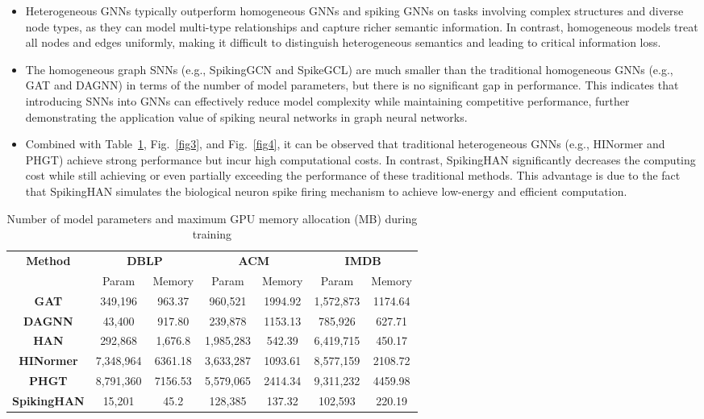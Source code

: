 \documentclass[letterpaper]{article} %
\begin{document}
\begin{itemize}
    \item Heterogeneous GNNs typically outperform homogeneous GNNs and spiking GNNs on tasks involving complex structures and diverse node types, as they can model multi-type relationships and capture richer semantic information. In contrast, homogeneous models treat all nodes and edges uniformly, making it difficult to distinguish heterogeneous semantics and leading to critical information loss.
    \item The homogeneous graph SNNs (e.g., SpikingGCN and SpikeGCL) are much smaller than the traditional homogeneous GNNs (e.g., GAT and DAGNN) in terms of the number of model parameters, but there is no significant gap in performance. This indicates that introducing SNNs into GNNs can effectively reduce model complexity while maintaining competitive performance, further demonstrating the application value of spiking neural networks in graph neural networks.
    \item Combined with Table~\ref{tab3}, Fig.~\ref{fig3}, and Fig.~\ref{fig4}, it can be observed that traditional heterogeneous GNNs (e.g., HINormer and PHGT) achieve strong performance but incur high computational costs. In contrast, SpikingHAN significantly decreases the computing cost while still achieving or even partially exceeding the performance of these traditional methods. This advantage is due to the fact that SpikingHAN simulates the biological neuron spike firing mechanism to achieve low-energy and efficient computation.
\end{itemize}

\begin{table}[h]
\centering
\scriptsize  
\renewcommand{\arraystretch}{1.3}
\setlength{\tabcolsep}{3pt}  %
\begin{tabular}{c|cc|cc|cc}
\hline
\textbf{Method} & \multicolumn{2}{c|}{\textbf{DBLP}} & \multicolumn{2}{c|}{\textbf{ACM}} & \multicolumn{2}{c}{\textbf{IMDB}} \\
\cline{2-7}
 & Param & Memory & Param & Memory & Param & Memory \\
\hline
\textbf{GAT}        & 349,196   & 963.37    & 960,521   & 1994.92   & 1,572,873  & 1174.64   \\
\textbf{DAGNN}      & 43,400    & 917.80    & 239,878   & 1153.13   & 785,926    & 627.71    \\
\textbf{HAN}        & 292,868   & 1,676.8   & 1,985,283 & 542.39    & 6,419,715  & 450.17    \\
\textbf{HINormer}   & 7,348,964 & 6361.18   & 3,633,287 & 1093.61   & 8,577,159  & 2108.72   \\
\textbf{PHGT}       & 8,791,360 & 7156.53   & 5,579,065 & 2414.34   & 9,311,232  & 4459.98   \\
\hline
\textbf{SpikingHAN} & 15,201    & 45.2      & 128,385   & 137.32    & 102,593    & 220.19    \\
\hline
\end{tabular}
\caption{Number of model parameters and maximum GPU memory allocation (MB) during training }
\label{tab3}
\end{table}
\end{document}
